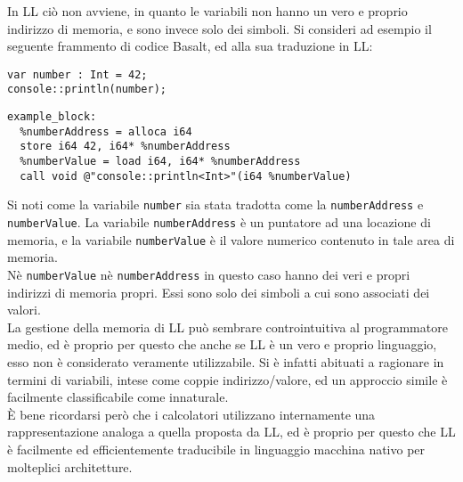 In LL ciò non avviene, in quanto le variabili non hanno un vero e proprio indirizzo di memoria, 
e sono invece solo dei simboli. Si consideri ad esempio il seguente frammento di codice Basalt, 
ed alla sua traduzione in LL:

\vspace{0.5cm}
\begin{lstlisting}[frame=single]
var number : Int = 42;
console::println(number);
\end{lstlisting}

\begin{lstlisting}[frame=single]
example_block:
  %numberAddress = alloca i64
  store i64 42, i64* %numberAddress
  %numberValue = load i64, i64* %numberAddress
  call void @"console::println<Int>"(i64 %numberValue)
\end{lstlisting}
\vspace{0.5cm}

Si noti come la variabile \texttt{number} sia stata tradotta come la \texttt{numberAddress} e \texttt{numberValue}.
La variabile \texttt{numberAddress} è un puntatore ad una locazione di memoria, e la variabile \texttt{numberValue}
è il valore numerico contenuto in tale area di memoria. \\

Nè \texttt{numberValue} nè \texttt{numberAddress} in 
questo caso hanno dei veri e propri indirizzi di memoria propri. Essi sono solo dei simboli 
a cui sono associati dei valori. \\

La gestione della memoria di LL può sembrare controintuitiva al programmatore medio, ed è proprio per questo 
che anche se LL è un vero e proprio linguaggio, esso non è considerato veramente utilizzabile. Si è infatti abituati
a ragionare in termini di variabili, intese come coppie indirizzo/valore, ed un approccio simile è facilmente 
classificabile come innaturale. \\

È bene ricordarsi però che i calcolatori utilizzano internamente una rappresentazione 
analoga a quella proposta da LL, ed è proprio per questo che LL è facilmente ed efficientemente traducibile 
in linguaggio macchina nativo per molteplici architetture. \\

\newpage